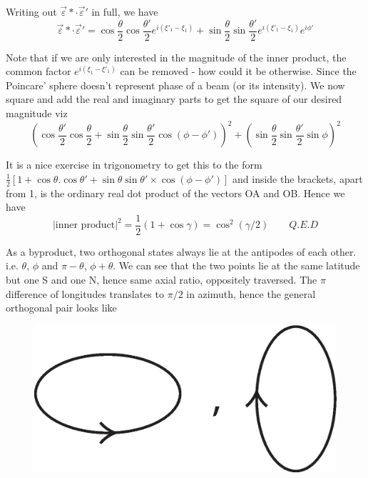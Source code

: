 Writing out $\overrightarrow{\varepsilon} \ast \cdot  \overrightarrow{\varepsilon}'$ in full, we have
$$
\overrightarrow{\varepsilon} \ast \cdot \overrightarrow{\varepsilon}' = \cos  \frac{\theta}{2} \cos \frac{\theta'}{2} e^{i (\xi'_1 - \xi_1)} + \sin \frac{\theta}{2} \sin \frac{\theta'}{2} e^{i (\xi'_1 - \xi_1)} e^{i \phi'}
$$

Note that if we are only interested in the magnitude of the inner product, the
common factor $e^{i(\xi_1 - \xi'_1)}$ can be removed - how could it be otherwise. Since the
Poincare' sphere doesn't represent phase of a beam (or its intensity). We now
square and add the real and imaginary parts to get the square of our desired
magnitude viz
$$
\left(\cos \frac{\theta'}{2} \cos \frac{\theta}{2} + \sin \frac{\theta}{2} \sin \frac{\theta'}{2} \cos (\phi - \phi') \right)^2 + \left(\sin \frac{\theta}{2} \sin \frac{\theta'}{2}
\sin \phi\right)^2
$$

It is a nice exercise in trigonometry to get this to the form $\frac{1}{2} [1 + \cos \theta . \cos \theta' +
\sin \theta \sin \theta'  \times \cos (\phi - \phi')]$ and inside the brackets, apart from 1, is the ordinary real dot product of the
vectors OA and OB. Hence we have
$$
|\text{inner product}|^2 = \frac{1}{2} (1 + \cos \gamma) = \cos^2 (\gamma/2) \qquad {Q.E.D}
$$


As a byproduct, two orthogonal states always lie at the antipodes of each
other. i.e. $\theta$, $\phi$ and $\pi - \theta$, $\phi + \theta$. We can see that the two points lie at the
same latitude but one S and one N, hence same axial ratio, oppositely traversed.
The $\pi$ difference of longitudes translates to $\pi/2$ in azimuth, hence the general
orthogonal pair looks like
\medskip

\begin{figure}[H]
\centering
\includegraphics[scale=0.25]{src/images/chap26/8.jpg}
\end{figure}
\bigskip

